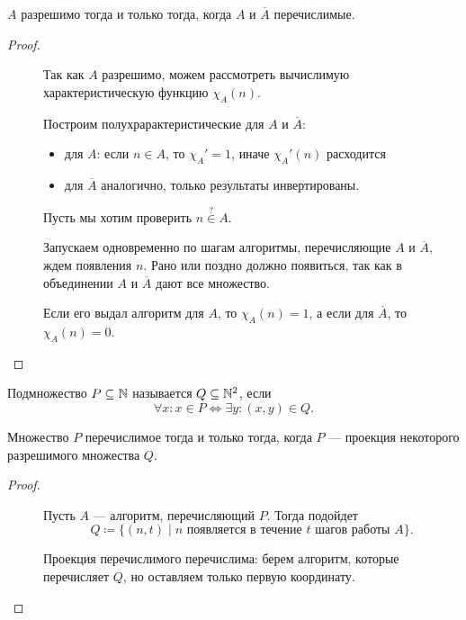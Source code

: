 \begin{thm}[Пост]
    $ A$ разрешимо тогда и только тогда, когда $ A$ и $ \overline{A}$ перечислимые.
\end{thm}
\begin{proof}
    ~\begin{description}
		\item[] 
			Так как $ A $ разрешимо, можем рассмотреть вычислимую характеристическую функцию $ \chi_{A}(n)$.

			Построим полухрарактеристические для $ A$ и $ \overline{A}$:
			\begin{itemize}
			\item для $ A$: если $ n \in A$, то $ \chi_{A}' = 1$, иначе $ \chi_{A}'(n)$ расходится
			\item для $ \overline{A}$ аналогично, только результаты инвертированы.
			\end{itemize}
		\item[]
	    Пусть мы хотим проверить $ n \stackrel{?}{\in} A$.

	    Запускаем одновременно по шагам алгоритмы, перечисляющие $ A$ и $ \overline{A}$, ждем появления $ n$. 
	    Рано или поздно должно появиться, так как в объединении $ A$ и $\overline{A}$ дают все множество. 
	    
	    Если его выдал алгоритм для $ A$, то $ \chi_A(n) = 1$, а если для $\overline{A}$, то $ \chi_A(n) = 0$.
    \end{description} 
\end{proof}


\begin{defn}[Проекция]
	Подмножество $ P \subseteq \mathbb{N}$ называется  $ Q \subseteq \mathbb{N}^2$, если   \[
		\forall x \colon x \in  P \Longleftrightarrow \exists y \colon  (x, y) \in  Q
	.\] 
\end{defn}

\begin{thm}[О проекции]
    Множество $ P$ перечислимое тогда и только тогда, когда $ P$ --- проекция некоторого разрешимого множества $ Q$.
\end{thm}
\begin{proof}
    ~\begin{description}
		\item[] 
			Пусть $ A$ --- алгоритм, перечисляющий $ P$. Тогда подойдет
			\[
				Q \coloneqq \{(n, t) \mid n \text{ появляется в течение } t \text{ шагов работы } A\}
			.\] 
		\item[] 
			Проекция перечислимого перечислима: берем алгоритм, которые перечисляет $ Q$, но оставляем только первую координату.
    \end{description} 
\end{proof}

